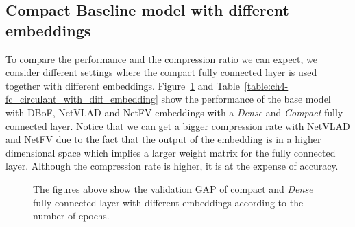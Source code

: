\subsection{Compact Baseline model with different embeddings}

To compare the performance and the compression ratio we can expect, we consider different settings where the compact fully connected layer is used together with different embeddings.
Figure~\ref{figure:ch4-learning_curve_circulant} and Table~\ref{table:ch4-fc_circulant_with_diff_embedding} show the performance of the base model with DBoF, NetVLAD and NetFV embeddings with a \emph{Dense} and \emph{Compact} fully connected layer.
Notice that we can get a bigger compression rate with NetVLAD and NetFV due to the fact that the output of the embedding is in a higher dimensional space which implies a larger weight matrix for the fully connected layer.
Although the compression rate is higher, it is at the expense of accuracy.

\begin{figure}[!htb]
  \centering
  
  \caption{The figures above show the validation GAP of \textmd{compact} and \emph{Dense} fully connected layer with different embeddings according to the number of epochs.}
  \label{figure:ch4-learning_curve_circulant}
\end{figure}

